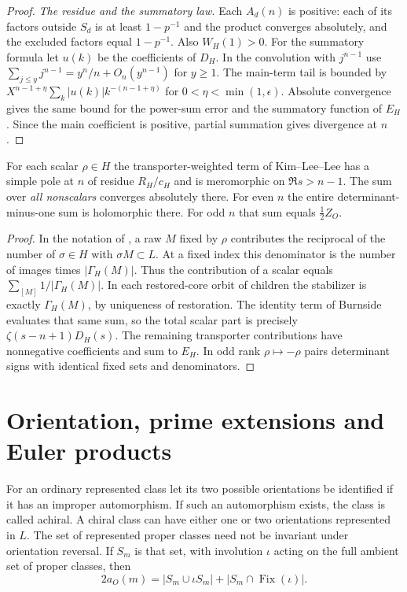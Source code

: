 \begin{proof}
\emph{The residue and the summatory law.}
Each $A_d(n)$ is positive: each of its factors outside $S_d$ is at least $1-p^{-1}$ and the product converges absolutely, and the excluded factors equal $1-p^{-1}$. Also $W_H(1)>0$. For the summatory formula let $u(k)$ be the coefficients of $D_H$. In the convolution with $j^{n-1}$ use $\sum_{j\le y}j^{n-1}=y^n/n+O_n(y^{n-1})$ for $y\ge1$. The main-term tail is bounded by $X^{n-1+\eta}\sum_k|u(k)|k^{-(n-1+\eta)}$ for $0<\eta<\min(1,\epsilon)$. Absolute convergence gives the same bound for the power-sum
error and the summatory function of $E_H$. Since the main coefficient
is positive, partial summation gives divergence at $n$.
\end{proof}

\begin{corollary}\label{cor:KLL}
For each scalar $\rho\in H$ the transporter-weighted term of Kim--Lee--Lee has a simple pole at $n$ of residue $R_H/c_H$ and is meromorphic on $\Re s>n-1$. The sum over \emph{all nonscalars} converges absolutely there. For even $n$ the entire determinant-minus-one sum is holomorphic there. For odd $n$ that sum equals $\tfrac12 Z_O$.
\end{corollary}
\begin{proof}
In the notation of \cite[\S2.4, (2.4)--(2.5)]{KLLpre}, a raw $M$ fixed by $\rho$ contributes the reciprocal of the number of $\sigma\in H$ with $\sigma M\subset L$. At a fixed index this denominator is the number of images times $|\Gamma_H(M)|$. Thus the contribution of a scalar equals $\sum_{[M]}1/|\Gamma_H(M)|$. In each restored-core orbit of children the stabilizer is exactly $\Gamma_H(M)$, by uniqueness of restoration. The identity term of Burnside evaluates that same sum, so the total scalar part is precisely $\zeta(s-n+1)D_H(s)$. The remaining transporter contributions have nonnegative
coefficients and sum to $E_H$. In odd rank $\rho\mapsto-\rho$ pairs determinant signs with identical fixed sets and denominators.
\end{proof}

\section{Orientation, prime extensions and Euler products}\label{sec:orientation}
For an ordinary represented class let its two possible orientations be identified if it has an improper automorphism. If such an automorphism exists, the class is called achiral. A chiral class can have either one or two orientations represented in $L$. The set of represented proper classes need not be invariant under orientation reversal. If $S_m$ is that set, with involution $\iota$ acting on the full ambient set of proper classes, then
\[
 2a_O(m)=|S_m\cup\iota S_m|+|S_m\cap\operatorname{Fix}(\iota)|.
\]

